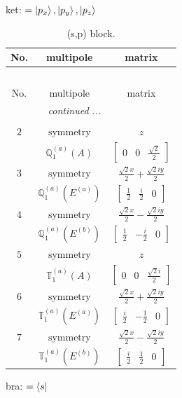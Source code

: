 \documentclass[fleqn,8pt,landscape]{jsarticle}
\begin{document}
\noindent
ket: $=\ket{p_{x}}, \ket{p_{y}}, \ket{p_{z}}$
\renewcommand{\arraystretch}{1.6}
\begin{longtable}{ccc}
\caption{(s,p) block.}
 \\
 \hline \hline
No. & multipole & matrix \\ \hline \endfirsthead

\multicolumn{2}{l}{\tablename\ \thetable{}} \\
 \hline \hline
No. & multipole & matrix \\ \hline \endhead

 \hline \hline
\multicolumn{2}{r}{\footnotesize\it continued ...} \\ \endfoot

 \hline \hline
\multicolumn{2}{r}{} \\ \endlastfoot

$ 2 $ & $ \text{symmetry} $ & $ z $ \\
$  $ & $ \mathbb{Q}_{1}^{(a)}(A) $ & $ \begin{bmatrix} 0 & 0 & \frac{\sqrt{2}}{2} \end{bmatrix} $ \\ \hline
$ 3 $ & $ \text{symmetry} $ & $ \frac{\sqrt{2} x}{2} + \frac{\sqrt{2} i y}{2} $ \\
$  $ & $ \mathbb{Q}_{1}^{(a)}(E^{(a)}) $ & $ \begin{bmatrix} \frac{1}{2} & \frac{i}{2} & 0 \end{bmatrix} $ \\ \hline
$ 4 $ & $ \text{symmetry} $ & $ \frac{\sqrt{2} x}{2} - \frac{\sqrt{2} i y}{2} $ \\
$  $ & $ \mathbb{Q}_{1}^{(a)}(E^{(b)}) $ & $ \begin{bmatrix} \frac{1}{2} & - \frac{i}{2} & 0 \end{bmatrix} $ \\ \hline
$ 5 $ & $ \text{symmetry} $ & $ z $ \\
$  $ & $ \mathbb{T}_{1}^{(a)}(A) $ & $ \begin{bmatrix} 0 & 0 & \frac{\sqrt{2} i}{2} \end{bmatrix} $ \\ \hline
$ 6 $ & $ \text{symmetry} $ & $ \frac{\sqrt{2} x}{2} + \frac{\sqrt{2} i y}{2} $ \\
$  $ & $ \mathbb{T}_{1}^{(a)}(E^{(a)}) $ & $ \begin{bmatrix} \frac{i}{2} & - \frac{1}{2} & 0 \end{bmatrix} $ \\ \hline
$ 7 $ & $ \text{symmetry} $ & $ \frac{\sqrt{2} x}{2} - \frac{\sqrt{2} i y}{2} $ \\
$  $ & $ \mathbb{T}_{1}^{(a)}(E^{(b)}) $ & $ \begin{bmatrix} \frac{i}{2} & \frac{1}{2} & 0 \end{bmatrix} $ \\ \hline
\end{longtable}
bra: $=\bra{s}$
\end{document}
